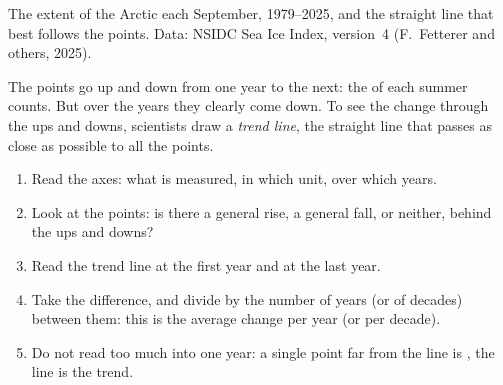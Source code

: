 \begin{omfigure}

{\small The extent of the Arctic  each September, 1979--2025, and
the straight line that best follows the points. Data: NSIDC Sea Ice Index,
version~4 (F.~Fetterer and others, 2025).}
\label{fig:g8:ice-on-earth:sea-ice}
\end{omfigure}

The points go up and down from one year to the next: the  of each
summer counts. But over the years they clearly come down. To see the
change through the ups and downs, scientists draw a \emph{trend line}, the
straight line that passes as close as possible to all the points.

\begin{method}
\begin{enumerate}
  \item Read the axes: what is measured, in which unit, over which years.
  \item Look at the points: is there a general rise, a general fall, or
        neither, behind the ups and downs?
  \item Read the trend line at the first year and at the last year.
  \item Take the difference, and divide by the number of years (or of
        decades) between them: this is the average change per year (or
        per decade).
  \item Do not read too much into one year: a single point far from the
        line is , the line is the trend.
\end{enumerate}
\end{method}

